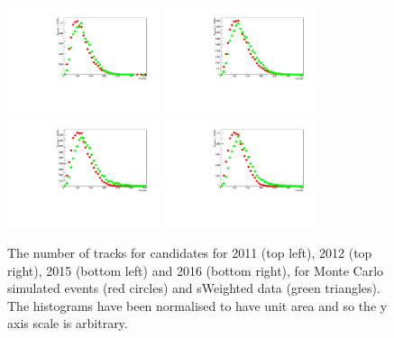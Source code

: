 \begin{figure}[ht]
  \centering
    \includegraphics[width=0.4\textwidth]{Figs/LifetimeMeasurement/2011_nTracks_Bd2KPi_MC_data_comparison_Dec_triggers.pdf}
    \includegraphics[width=0.4\textwidth]{Figs/LifetimeMeasurement/2012_nTracks_Bd2KPi_MC_data_comparison_Dec_triggers.pdf}
    \includegraphics[width=0.4\textwidth]{Figs/LifetimeMeasurement/2015_nTracks_Bd2KPi_MC_data_comparison_Dec_triggers.pdf}
    \includegraphics[width=0.4\textwidth]{Figs/LifetimeMeasurement/2016_nTracks_Bd2KPi_MC_data_comparison_Dec_triggers.pdf}
  \caption{The number of tracks for \bdkpi candidates for 2011 (top left), 2012 (top right), 2015 (bottom left) and 2016 (bottom right), for Monte Carlo simulated events (red circles) and sWeighted data (green triangles). The histograms have been normalised to have unit area and so the y axis scale is arbitrary.}
  \label{fig:nTracksMCDataComp}
\end{figure}
\FloatBarrier


